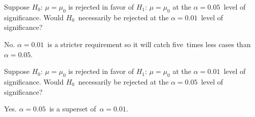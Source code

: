 \begin{problem}
\end{problem}

\begin{subproblem}
  Suppose $H_0$: ${\mu = \mu_0}$ is rejected in favor of $H_1$: ${\mu = \mu_0}$ at the ${\alpha = 0.05}$~level of significance.  Would $H_0$~necessarily be rejected at the ${\alpha = 0.01}$~level of significance?
\end{subproblem}

\noindent
No.  ${\alpha = 0.01}$~is a stricter requirement so it will catch five~times less cases than ${\alpha = 0.05}$.

\begin{subproblem}
  Suppose $H_0$: ${\mu = \mu_0}$ is rejected in favor of $H_1$: ${\mu = \mu_0}$ at the ${\alpha = 0.01}$~level of significance.  Would $H_0$~necessarily be rejected at the ${\alpha = 0.05}$~level of significance?
\end{subproblem}

\noindent
Yes.  ${\alpha = 0.05}$~is a superset of~${\alpha = 0.01}$.
